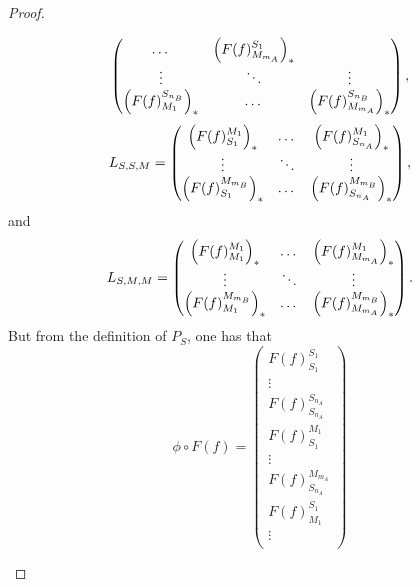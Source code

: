 \begin{proof}
\begin{enumerate}
{\[\begin{pmatrix}
                    \dots &
                    \left(  F(f)_{M_{m_A}}^{S_1}  \right)_* \\
                    \vdots & \ddots & \vdots \\
                    \left(  F(f)_{M_1}^{S_{n_B}}  \right)_* &
                    \dots &
                    \left(  F(f)_{M_{m_A}}^{S_{n_B}}  \right)_* \\
                \end{pmatrix},
            \]
            \[
                L_{S, S, M} =
                \begin{pmatrix}
                    \left(  F(f)_{S_1}^{M_1}  \right)_* &
                    \dots &
                    \left(  F(f)_{S_{n_A}}^{M_1}  \right)_* \\
                    \vdots & \ddots & \vdots \\
                    \left(  F(f)_{S_1}^{M_{m_B}}  \right)_* &
                    \dots &
                    \left(  F(f)_{S_{n_A}}^{M_{m_B}}  \right)_* \\
                \end{pmatrix},
            \]
            and
            \[
                L_{S, M, M} =
                \begin{pmatrix}
                    \left(  F(f)_{M_1}^{M_1}  \right)_* &
                    \dots &
                    \left(  F(f)_{M_{m_A}}^{M_1}  \right)_* \\
                    \vdots & \ddots & \vdots \\
                    \left(  F(f)_{M_1}^{M_{m_B}}  \right)_* &
                    \dots &
                    \left(  F(f)_{M_{m_A}}^{M_{m_B}}  \right)_* \\
                \end{pmatrix}.
            \]
            But from the definition of \( P_S \), one has that
            \[
                \phi \circ F(f) =
                \begin{pmatrix}
                    F(f)_{S_1}^{S_1} \\
                    \vdots \\
                    F(f)_{S_{n_A}}^{S_{n_A}} \\
                    F(f)_{S_1}^{M_1} \\
                    \vdots \\
                    F(f)_{S_{n_A}}^{M_{m_A}} \\
                    F(f)_{M_1}^{S_1} \\
                    \vdots \\

\end{pmatrix}\]}
\end{enumerate}
\end{proof}
